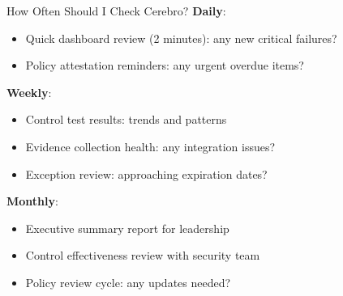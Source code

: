 \documentclass[aspectratio=169]{beamer}
\begin{document}
\begin{frame}{How Often Should I Check Cerebro?}
  \textbf{Daily}:
  \begin{itemize}
    \item Quick dashboard review (2 minutes): any new critical failures?
    \item Policy attestation reminders: any urgent overdue items?
  \end{itemize}
  
  \vspace{0.3cm}
  
  \textbf{Weekly}:
  \begin{itemize}
    \item Control test results: trends and patterns
    \item Evidence collection health: any integration issues?
    \item Exception review: approaching expiration dates?
  \end{itemize}
  
  \vspace{0.3cm}
  
  \textbf{Monthly}:
  \begin{itemize}
    \item Executive summary report for leadership
    \item Control effectiveness review with security team
    \item Policy review cycle: any updates needed?
  \end{itemize}
\end{frame}
\end{document}
